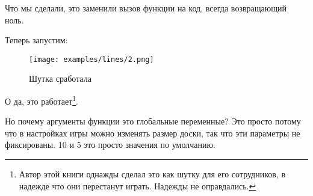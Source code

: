 Что мы сделали, это заменили вызов функции  
на код, всегда возвращающий ноль.

\clearpage
Теперь запустим:

\begin{figure}[H]
\centering
\texttt{[image: examples/lines/2.png]}
\caption{Шутка сработала}
\end{figure}

О да, это работает\footnote{Автор этой книги однажды сделал это как 
шутку для его сотрудников, в надежде что они перестанут играть. 
Надежды не оправдались.}.

Но почему аргументы функции  это глобальные переменные?
Это просто потому что в настройках игры можно изменять размер доски, так что эти параметры не фиксированы.
10 и 5 это просто значения по умолчанию.
